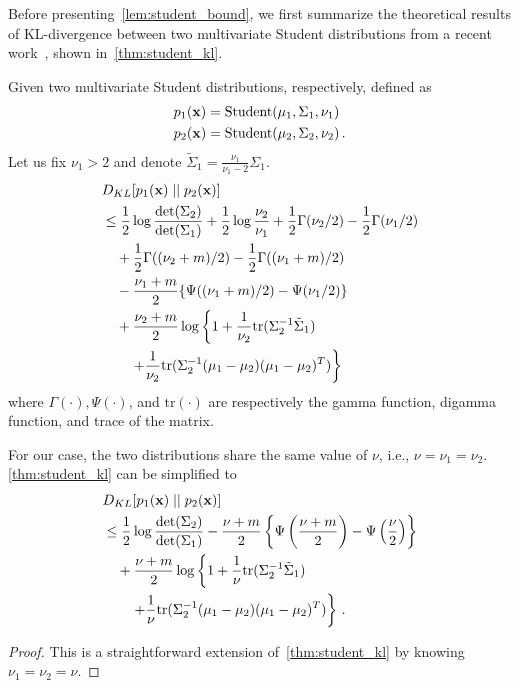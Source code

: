 {Before presenting~\cref{lem:student_bound}, we first summarize the theoretical results of KL-divergence between two multivariate Student distributions from a recent work~\cite{huang2019novel}, shown in~\cref{thm:student_kl}.
\begin{theorem}
\label{thm:student_kl}
Given two multivariate Student distributions, respectively, defined as 
\begin{align*}
p_1(\mathbf{x}) &= \mathrm{Student}(\mu_1, \Sigma_1, \nu_1)  \\
p_2(\mathbf{x}) &= \mathrm{Student}(\mu_2, \Sigma_2, \nu_2) \,.
\end{align*}
Let us fix $\nu_1 > 2$ and denote $\tilde{\Sigma}_1 = \frac {\nu_1}{\nu_1 - 2}\Sigma_1$.
\begin{align}
&D_{KL} [ p_1(\mathbf{x}) \mid \mid p_2(\mathbf{x}) ] \notag \\
&\le \frac 1 2 \log \frac{\mathrm{det}(\Sigma_2)}{\mathrm{det}(\Sigma_1)} + \frac 1 2 \log \frac{\nu_2}{\nu_1} +  \frac 1 2 \Gamma(\nu_2/2) - \frac 1 2 \Gamma(\nu_1/2) \notag \\
&\quad + \frac 1 2 \Gamma((\nu_2+m)/2) - \frac 1 2 \Gamma((\nu_1+m)/2) \notag \\
&\quad - \frac{\nu_1 + m}{2}\{\Psi({(\nu_1 + m)}/{2}) - \Psi(\nu_1/ 2)\} \notag \\
&\quad + \frac {\nu_2 + m} 2 \log \left\{ 1 + \frac{1}{\nu_2} \mathrm{tr}(\Sigma_2^{-1} \tilde{\Sigma}_1)  \right. \notag \\
&\qquad \left. + \frac{1}{\nu_2} \mathrm{tr}(\Sigma_2^{-1} (\mu_1 - \mu_2)(\mu_1 - \mu_2)^T) \right\}
\end{align}
where $\Gamma(\cdot), \Psi(\cdot)$, and $\mathrm{tr}(\cdot)$ are respectively the gamma function, digamma function, and trace of the matrix.  
\end{theorem}

\begin{corollary}
\label{corol:student_kl}
For our case, the two distributions share the same value of $\nu$, i.e., $\nu=\nu_1=\nu_2$.
\cref{thm:student_kl} can be simplified to
\begin{align}
&D_{KL} [ p_1(\mathbf{x}) \mid \mid p_2(\mathbf{x}) ] \notag \\
&\le \frac 1 2 \log \frac{\mathrm{det}(\Sigma_2)}{\mathrm{det}(\Sigma_1)} - \frac{\nu + m}{2}\left\{\Psi\left( \frac{\nu + m}{2} \right) - \Psi\left(\frac{\nu}{2} \right ) \right\} \notag \\
&\quad + \frac {\nu + m} 2 \log \left\{ 1 + \frac{1}{\nu} \mathrm{tr}(\Sigma_2^{-1} \tilde{\Sigma}_1)  \right. \notag \\
&\qquad \left. + \frac{1}{\nu} \mathrm{tr}(\Sigma_2^{-1} (\mu_1 - \mu_2)(\mu_1 - \mu_2)^T) \right\} \,.
\end{align}
\end{corollary}
\begin{proof}
This is a straightforward extension of~\cref{thm:student_kl} by knowing $\nu_1 = \nu_2 = \nu$.
\end{proof}

}
